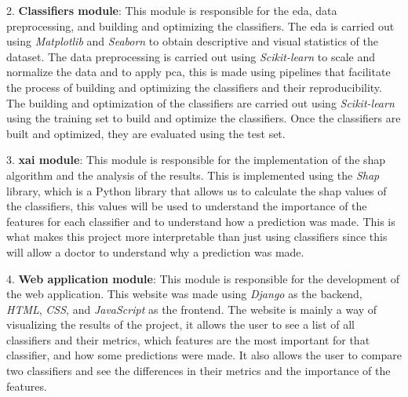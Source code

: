 2. \textbf{Classifiers module}: This module is responsible for the \ac{eda}, data preprocessing, and building and optimizing the classifiers. The \ac{eda} is carried out using \textit{Matplotlib} \cite{hunter_matplotlib_2007} and \textit{Seaborn} \cite{waskom_seaborn_2021} to obtain descriptive and visual statistics of the dataset. The data preprocessing is carried out using \textit{Scikit-learn} to scale and normalize the data and to apply \ac{pca}, this is made using pipelines that facilitate the process of building and optimizing the classifiers and their reproducibility. The building and optimization of the classifiers are carried out using \textit{Scikit-learn} using the training set to build and optimize the classifiers. Once the classifiers are built and optimized, they are evaluated using the test set.

3. \textbf{\ac{xai} module}: This module is responsible for the implementation of the \ac{shap} algorithm and the analysis of the results. This is implemented using the \textit{Shap} library, which is a Python library that allows us to calculate the \ac{shap} values of the classifiers, this values will be used to understand the importance of the features for each classifier and to understand how a prediction was made. This is what makes this project more interpretable than just using classifiers since this will allow a doctor to understand why a prediction was made.

4. \textbf{Web application module}: This module is responsible for the development of the web application. This website was made using \textit{Django} as the backend, \textit{HTML}, \textit{CSS}, and \textit{JavaScript} as the frontend. The website is mainly a way of visualizing the results of the project, it allows the user to see a list of all classifiers and their metrics, which features are the most important for that classifier, and how some predictions were made. It also allows the user to compare two classifiers and see the differences in their metrics and the importance of the features.
